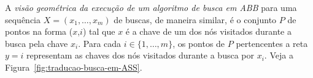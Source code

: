 A \textit{visão geométrica da execução de um algoritmo de busca em ABB} para uma sequência $X = (x_{1},\ldots,x_{m})$ de buscas, de maneira similar, é o conjunto $P$ de pontos na forma ($x$,$i$) tal que $x$ é a chave de um dos nós visitados durante a busca pela chave $x_i$. Para cada $i \in \{1,\ldots,m\}$, os pontos de $P$ pertencentes a reta $y = i$ representam as chaves dos nós visitados durante a busca por $x_i$. Veja a Figura~\ref{fig:traducao-busca-em-ASS}.

\begin{figure}[h!]
    \centering
    \begin{minipage}[b]{0.34\textwidth}
        \centering
    \end{minipage}\hfill
    \begin{minipage}[b]{0.33\textwidth}
        \centering
\end{minipage}
\end{figure}
